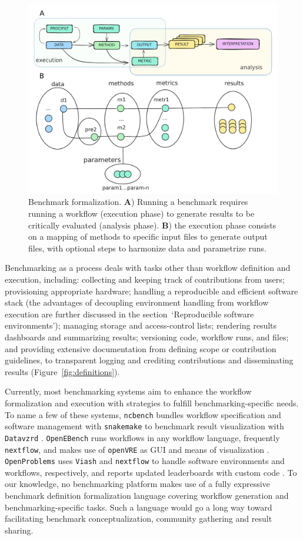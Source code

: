 \documentclass[11pt]{article}
\begin{document}
\begin{figure}
    \centering
    \includegraphics[width=0.75\linewidth]{figures/fig3_bens_formalization_arrows.pdf} %
    \caption[Benchmark formalization.]{Benchmark formalization. \textbf{A}) Running a benchmark requires running a workflow (execution phase) to generate results to be critically evaluated (analysis phase). \textbf{B}) the execution phase consists on a mapping of methods to specific input files to generate output files, with optional steps to harmonize data and parametrize runs.}
    \label{fig:formalization}
\end{figure}

Benchmarking as a process deals with tasks other than workflow definition and execution, including: collecting and keeping track of contributions from users; provisioning appropriate hardware; handling a reproducible and efficient software stack {\color{red}(the advantages of decoupling environment handling from workflow execution are further discussed in the section~`Reproducible software environments')}; managing storage and access-control lists; rendering results dashboards and summarizing results; versioning code, workflow runs, and files; and providing extensive documentation from defining scope or contribution guidelines, to transparent logging and crediting contributions and disseminating results {\color{red}(Figure~\ref{fig:definitions})}.

Currently, most benchmarking systems aim to enhance the workflow formalization and execution with strategies to fulfill benchmarking-specific needs. To name a few of these systems, \texttt{ncbench} bundles workflow specification and software management with \texttt{snakemake} to benchmark result visualization with \texttt{Datavzrd} \cite{Hanssen2023-uf}. \texttt{OpenEBench} runs workflows in any workflow language, frequently \texttt{nextflow}, and makes use of \texttt{openVRE} as GUI and means of visualization \cite{Capella-Gutierrez2017-dh}. \texttt{OpenProblems} uses \texttt{Viash} and \texttt{nextflow} to handle software environments and workflows, respectively, and reports updated leaderboards with custom code \cite{Luecken2024-fk}. To our knowledge, no benchmarking platform makes use of a fully expressive benchmark definition formalization language covering workflow generation and benchmarking-specific tasks. Such a language would go a long way toward facilitating benchmark conceptualization, community gathering and result sharing.
\end{document}

